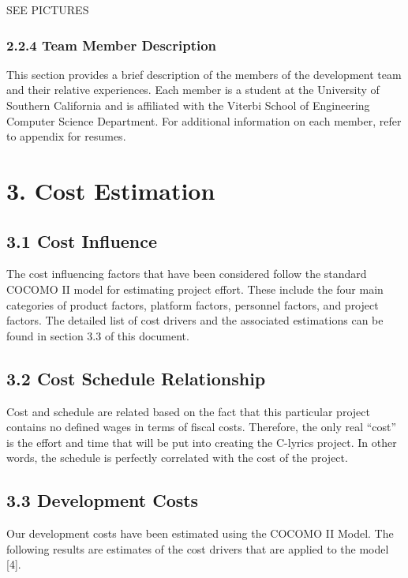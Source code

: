 \documentclass[]{article}
\begin{document}
SEE PICTURES

\subsubsection{2.2.4 Team Member
Description}\label{team-member-description}

This section provides a brief description of the members of the
development team and their relative experiences. Each member is a
student at the University of Southern California and is affiliated with
the Viterbi School of Engineering Computer Science Department. For
additional information on each member, refer to appendix for resumes.

\section{3. Cost Estimation}\label{cost-estimation}

\subsection{3.1 Cost Influence}\label{cost-influence}

The cost influencing factors that have been considered follow the
standard COCOMO II model for estimating project effort. These include
the four main categories of product factors, platform factors, personnel
factors, and project factors. The detailed list of cost drivers and the
associated estimations can be found in section 3.3 of this document.

\subsection{3.2 Cost Schedule
Relationship}\label{cost-schedule-relationship}

Cost and schedule are related based on the fact that this particular
project contains no defined wages in terms of fiscal costs. Therefore,
the only real ``cost'' is the effort and time that will be put into
creating the C-lyrics project. In other words, the schedule is perfectly
correlated with the cost of the project.

\subsection{3.3 Development Costs}\label{development-costs}

Our development costs have been estimated using the COCOMO II Model. The
following results are estimates of the cost drivers that are applied to
the model {[}4{]}.
\end{document}
